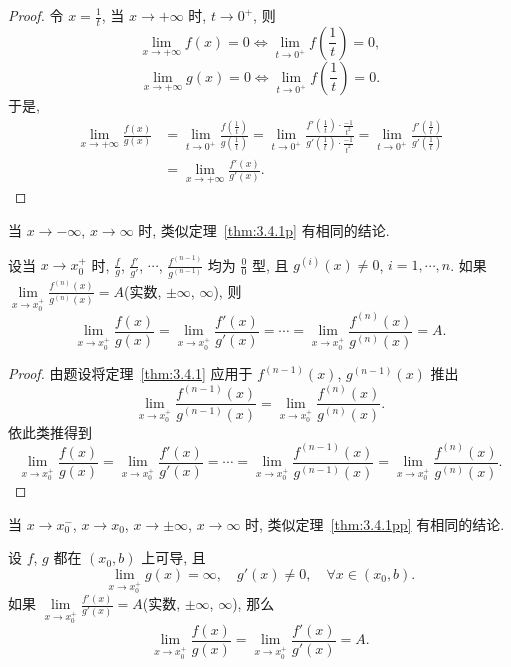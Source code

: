 \begin{proof}
令 $x=\frac{1}{t}$, 当 $x\to+\infty$ 时, $t\to0^{+}$, 则
\[
\lim_{x\to+\infty}f(x)=0\Longleftrightarrow\lim_{t\to0^{+}}f\left(\frac{1}{t}\right)=0,
\]
\[
\lim_{x\to+\infty}g(x)=0\Longleftrightarrow\lim_{t\to0^{+}}f\left(\frac{1}{t}\right)=0.
\]
于是,
\[
\begin{aligned}
\lim_{x\to+\infty}\frac{f(x)}{g(x)}&=\lim_{t\to0^{+}}\frac{f\left(\frac{1}{t}\right)}{g\left(\frac{1}{t}\right)}=\lim_{t\to0^{+}}\frac{f'\left(\frac{1}{t}\right)\cdot\frac{-1}{t^{2}}}{g'\left(\frac{1}{t}\right)\cdot\frac{-1}{t^{2}}}=\lim_{t\to0^{+}}\frac{f'\left(\frac{1}{t}\right)}{g'\left(\frac{1}{t}\right)}\\
&=\lim_{x\to+\infty}\frac{f'(x)}{g'(x)}.
\end{aligned}
\]
\end{proof}

\begin{remarkp}\label{rem:3.4.1p}
当 $x\to-\infty$, $x\to\infty$ 时, 类似定理~\ref{thm:3.4.1p} 有相同的结论.
\end{remarkp}

\begin{theorempp}\label{thm:3.4.1pp}
设当 $x\to x_0^{+}$ 时, $\frac{f}{g}$, $\frac{f'}{g'}$, $\cdots$, $\frac{f^{(n-1)}}{g^{(n-1)}}$ 均为 $\frac{0}{0}$ 型, 且 $g^{(i)}(x)\neq0$, $i=1,\cdots,n$. 如果 $\lim\limits_{x\to x_0^{+}}\frac{f^{(n)}(x)}{g^{(n)}(x)}=A$(实数, $\pm\infty$, $\infty$), 则
\[
\lim_{x\to x_0^{+}}\frac{f(x)}{g(x)}=\lim_{x\to x_0^{+}}\frac{f'(x)}{g'(x)}=\cdots=\lim_{x\to x_0^{+}}\frac{f^{(n)}(x)}{g^{(n)}(x)}=A.
\]
\end{theorempp}

\begin{proof}
由题设将定理~\ref{thm:3.4.1} 应用于 $f^{(n-1)}(x)$, $g^{(n-1)}(x)$ 推出
\[
\lim_{x\to x_0^{+}}\frac{f^{(n-1)}(x)}{g^{(n-1)}(x)}=\lim_{x\to x_0^{+}}\frac{f^{(n)}(x)}{g^{(n)}(x)}.
\]
依此类推得到
\[
\lim_{x\to x_0^{+}}\frac{f(x)}{g(x)}=\lim_{x\to x_0^{+}}\frac{f'(x)}{g'(x)}=\cdots=\lim_{x\to x_0^{+}}\frac{f^{(n-1)}(x)}{g^{(n-1)}(x)}=\lim_{x\to x_0^{+}}\frac{f^{(n)}(x)}{g^{(n)}(x)}.
\]
\end{proof}

\begin{remarkpp}\label{rem:3.4.1pp}
当 $x\to x_0^{-}$, $x\to x_0$, $x\to\pm\infty$, $x\to\infty$ 时, 类似定理~\ref{thm:3.4.1pp} 有相同的结论.
\end{remarkpp}

\begin{theorem}\label{thm:3.4.2}
设 $f$, $g$ 都在 $(x_0,b)$ 上可导, 且
\[
\lim_{x\to x_0^{+}}g(x)=\infty,\quad g'(x)\neq0,\quad \forall x\in(x_0,b).
\]
如果 $\lim\limits_{x\to x_0^{+}}\frac{f'(x)}{g'(x)}=A$(实数, $\pm\infty$, $\infty$), 那么
\[
\lim_{x\to x_0^{+}}\frac{f(x)}{g(x)}=\lim_{x\to x_0^{+}}\frac{f'(x)}{g'(x)}=A.
\]
\end{theorem}


